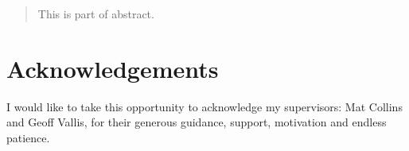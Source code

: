 
\maketitle

\begin{abstract}
This is part of abstract.
\end{abstract}

\makedeclaration

\newpage
\chapter*{Acknowledgements}
I would like to take this opportunity to acknowledge my supervisors: Mat Collins and Geoff Vallis, for their generous guidance, support, motivation and endless patience. 


\newpage
\pagestyle{fancy}
\setcounter{tocdepth}{4}
\bgroup
\hypersetup{linkcolor=black}
\tableofcontents
\egroup

\newpage
{}
\bgroup
\hypersetup{linkcolor=black}
\listoftables
\egroup

\newpage
{}
\bgroup
\hypersetup{linkcolor=black}
\listoffigures
\egroup


